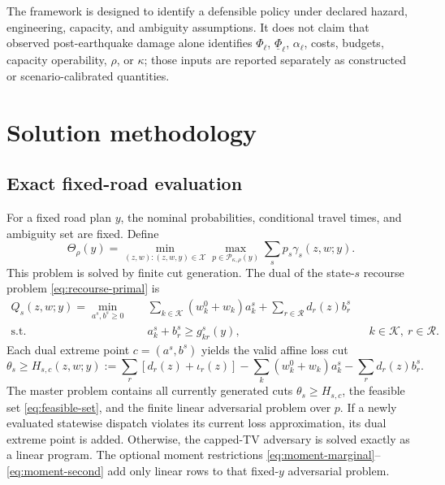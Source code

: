 The framework is designed to identify a defensible policy under declared
hazard, engineering, capacity, and ambiguity assumptions. It does not claim
that observed post-earthquake damage alone identifies \(\Phi_\ell\),
\(\underline\Phi_\ell\), \(\alpha_\ell\), costs, budgets, capacity
operability, \(\rho\), or \(\kappa\); those inputs are reported separately
as constructed or scenario-calibrated quantities.


\section{Solution methodology}
\label{sec:solution}

\subsection{Exact fixed-road evaluation}
\label{sec:fixed-y}

For a fixed road plan \(y\), the nominal probabilities, conditional travel
times, and ambiguity set are fixed. Define
\begin{equation}
 \Theta_\rho(y)
 =
 \min_{(z,w):(z,w,y)\in\mathcal X}
 \max_{p\in\mathcal P_{\kappa,\rho}(y)}
 \sum_s p_s\gamma_s(z,w;y).
\label{eq:fixed-y-value}
\end{equation}
This problem is solved by finite cut generation. The dual of the
state-\(s\) recourse problem \eqref{eq:recourse-primal} is
\begin{align}
 Q_s(z,w;y)
 =\min_{a^s,b^s\geq0}\quad&
   \sum_{k\in\mathcal K}(w_k^0+w_k)a_k^s+
   \sum_{r\in\mathcal R}d_r(z)b_r^s \label{eq:recourse-dual}\\
 \text{s.t.}\quad&
   a_k^s+b_r^s\geq g_{kr}^s(y),
      &&k\in\mathcal K,\ r\in\mathcal R. \nonumber
\end{align}
Each dual extreme point \(c=(a^s,b^s)\) yields the valid affine loss cut
\begin{equation}
 \theta_s\geq
 H_{s,c}(z,w;y)
 :=
 \sum_r[d_r(z)+\iota_r(z)]
 -\sum_k(w_k^0+w_k)a_k^s-\sum_r d_r(z)b_r^s .
\label{eq:recourse-cut}
\end{equation}
The master problem contains all currently generated cuts
\(\theta_s\geq H_{s,c}\), the feasible set \eqref{eq:feasible-set}, and the
finite linear adversarial problem over \(p\). If a newly evaluated statewise
dispatch violates its current loss approximation, its dual extreme point is
added. Otherwise, the capped-TV adversary is solved exactly as a linear
program. The optional moment restrictions
\eqref{eq:moment-marginal}--\eqref{eq:moment-second} add only linear rows to
that fixed-\(y\) adversarial problem.

